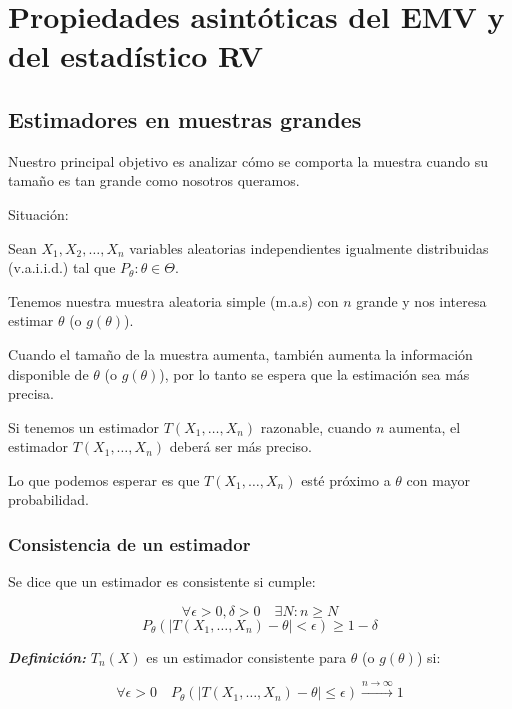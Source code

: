 \section{Propiedades asintóticas del EMV y del estadístico RV}


\subsection{Estimadores en muestras grandes}

Nuestro principal objetivo es analizar cómo se comporta la muestra cuando su tamaño es tan grande como nosotros queramos.
\setlength{\parskip}{1em}   %

Situación:
\setlength{\parskip}{0em}   %

Sean $X_1, X_2, \dots, X_n$ variables aleatorias independientes igualmente distribuidas (v.a.i.i.d.) tal que $P_\theta:\theta \in \Theta$.

Tenemos nuestra muestra aleatoria simple (m.a.s) con $n$ grande y nos interesa estimar $\theta$ (o $g(\theta)$).

\setlength{\parskip}{1em}   %
Cuando el tamaño de la muestra aumenta, también aumenta la información disponible de $ \theta $ (o $ g(\theta) $), por lo tanto se espera que la estimación sea más precisa.

Si tenemos un estimador $T(X_1, \dots, X_n)$ razonable, cuando $n$ aumenta, el estimador $T(X_1, \dots, X_n)$ deberá ser más preciso.

\setlength{\parskip}{0em}   %
Lo que podemos esperar es que $T(X_1, \dots, X_n)$ esté próximo a $\theta$ con mayor probabilidad.

\subsubsection{Consistencia de un estimador}

Se dice que un estimador es consistente si cumple:
\setlength{\parskip}{1em}

\[
    \forall \epsilon > 0, \delta > 0 \quad \exists N: n \geq N
\]
\[
    P_\theta(|T(X_1, \dots, X_n) - \theta| < \epsilon) \geq 1 - \delta
\]

\textbf{\textit{Definición: }} $T_n(X)$ es un estimador consistente para $\theta$ (o $g(\theta)$) si:

\[
    \forall \epsilon > 0 \quad P_\theta\left(|T(X_1, \dots, X_n) - \theta| \leq \epsilon\right) \xrightarrow{n \to \infty} 1
\]

